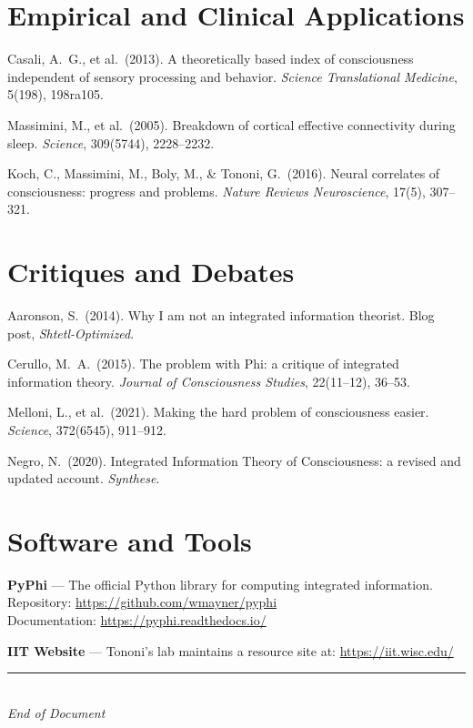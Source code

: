 \documentclass[11pt,a4paper]{report}
\begin{document}
\section*{Empirical and Clinical Applications}
\begin{enumerate}[label={[\arabic*]}, leftmargin=2.5em, start=10]
  \item Casali, A.\ G., et al.\ (2013). A theoretically based index of consciousness independent of sensory processing and behavior. \textit{Science Translational Medicine}, 5(198), 198ra105.
  \item Massimini, M., et al.\ (2005). Breakdown of cortical effective connectivity during sleep. \textit{Science}, 309(5744), 2228--2232.
  \item Koch, C., Massimini, M., Boly, M., \& Tononi, G.\ (2016). Neural correlates of consciousness: progress and problems. \textit{Nature Reviews Neuroscience}, 17(5), 307--321.
\end{enumerate}

\section*{Critiques and Debates}
\begin{enumerate}[label={[\arabic*]}, leftmargin=2.5em, start=13]
  \item Aaronson, S.\ (2014). Why I am not an integrated information theorist. Blog post, \textit{Shtetl-Optimized}.
  \item Cerullo, M.\ A.\ (2015). The problem with Phi: a critique of integrated information theory. \textit{Journal of Consciousness Studies}, 22(11--12), 36--53.
  \item Melloni, L., et al.\ (2021). Making the hard problem of consciousness easier. \textit{Science}, 372(6545), 911--912.
  \item Negro, N.\ (2020). Integrated Information Theory of Consciousness: a revised and updated account. \textit{Synthese}.
\end{enumerate}

\section*{Software and Tools}

\textbf{PyPhi} --- The official Python library for computing integrated information.\\
Repository: \url{https://github.com/wmayner/pyphi}\\
Documentation: \url{https://pyphi.readthedocs.io/}

\textbf{IIT Website} --- Tononi's lab maintains a resource site at: \url{https://iit.wisc.edu/}

\vfill
\begin{center}
  {\color{gray}\rule{0.4\textwidth}{0.5pt}}\\[8pt]
  {\small\color{gray}\itshape End of Document}
\end{center}
\end{document}
